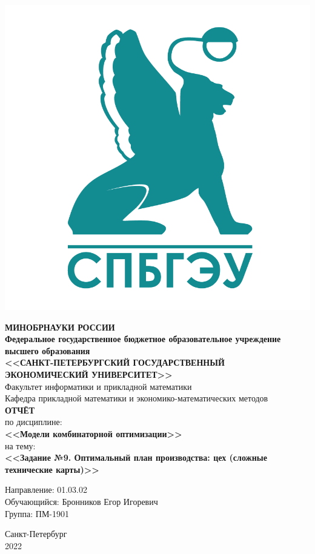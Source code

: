 \documentclass[14pt,fleqn]{extarticle}
\begin{document}
	\begin{titlepage}
		\includegraphics[scale=0.12]{logo}
		\begin{center}
			\textbf{МИНОБРНАУКИ РОССИИ}\\
			\vspace{0.2cm}
			\textbf{Федеральное государственное бюджетное образовательное учреждение высшего образования}\\
			\textbf{<<САНКТ-ПЕТЕРБУРГСКИЙ ГОСУДАРСТВЕННЫЙ ЭКОНОМИЧЕСКИЙ УНИВЕРСИТЕТ>>}\\
			\vspace{0.6cm}
			Факультет информатики и прикладной математики\\
			Кафедра прикладной математики и экономико-математических методов\\
			\vspace{1cm}
			\textbf{ОТЧЁТ}\\
			по дисциплине:\\
			\textbf{<<Модели комбинаторной оптимизации>>}\\
			на тему:\\
			\textbf{<<Задание №9. Оптимальный план производства: цех (сложные технические карты)>>}\\
		\end{center}
		\vspace{1cm}
		Направление: 01.03.02\\
		Обучающийся: Бронников Егор Игоревич\\
		Группа: ПМ-1901\\
		\vfill
		\begin{center}
			Санкт-Петербург\\
			2022\\
		\end{center}
	\end{titlepage}
	
\end{document}
